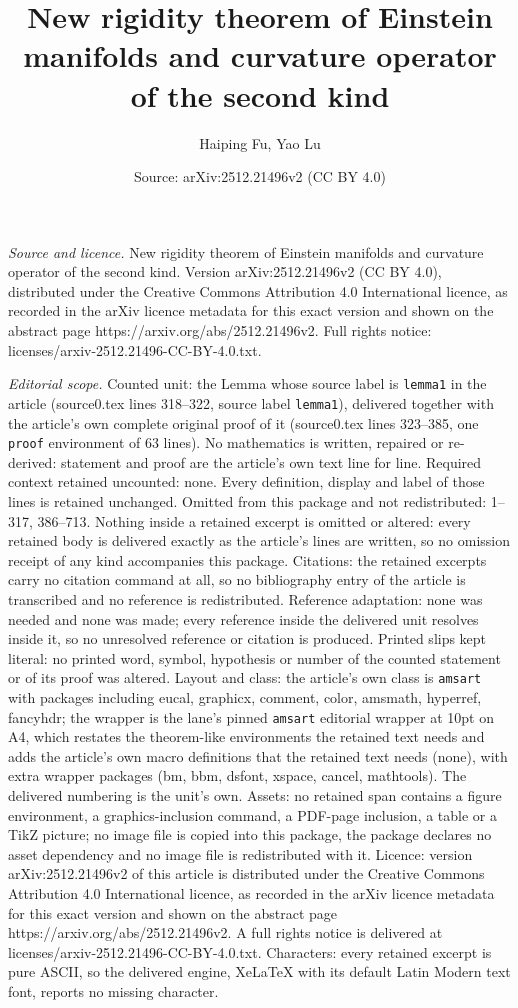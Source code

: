 \documentclass[10pt,a4paper]{amsart}
\title[New rigidity theorem of Einstein manifolds and curvature ope]{New rigidity theorem of Einstein manifolds and curvature operator of the second kind}
\author{Haiping Fu, Yao Lu}
\date{Source: arXiv:2512.21496v2 (CC BY 4.0)}
\begin{document}
\maketitle

\noindent\emph{Source and licence.} New rigidity theorem of Einstein manifolds and curvature operator of the second kind. Version arXiv:2512.21496v2 (CC BY 4.0), distributed under the Creative Commons Attribution 4.0 International licence, as recorded in the arXiv licence metadata for this exact version and shown on the abstract page https://arxiv.org/abs/2512.21496v2. Full rights notice: licenses/arxiv-2512.21496-CC-BY-4.0.txt.\par\smallskip

\noindent\textit{Editorial scope.} Counted unit: the Lemma whose source label is \texttt{lemma1} in the article (source0.tex lines 318--322, source label \texttt{lemma1}), delivered together with the article's own complete original proof of it (source0.tex lines 323--385, one \texttt{proof} environment of 63 lines). No mathematics is written, repaired or re-derived: statement and proof are the article's own text line for line. Required context retained uncounted: none. Every definition, display and label of those lines is retained unchanged. Omitted from this package and not redistributed: 1--317, 386--713. Nothing inside a retained excerpt is omitted or altered: every retained body is delivered exactly as the article's lines are written, so no omission receipt of any kind accompanies this package. Citations: the retained excerpts carry no citation command at all, so no bibliography entry of the article is transcribed and no reference is redistributed. Reference adaptation: none was needed and none was made; every reference inside the delivered unit resolves inside it, so no unresolved reference or citation is produced. Printed slips kept literal: no printed word, symbol, hypothesis or number of the counted statement or of its proof was altered. Layout and class: the article's own class is \texttt{amsart} with packages including eucal, graphicx, comment, color, amsmath, hyperref, fancyhdr; the wrapper is the lane's pinned \texttt{amsart} editorial wrapper at 10pt on A4, which restates the theorem-like environments the retained text needs and adds the article's own macro definitions that the retained text needs (none), with extra wrapper packages (bm, bbm, dsfont, xspace, cancel, mathtools). The delivered numbering is the unit's own. Assets: no retained span contains a figure environment, a graphics-inclusion command, a PDF-page inclusion, a table or a TikZ picture; no image file is copied into this package, the package declares no asset dependency and no image file is redistributed with it. Licence: version arXiv:2512.21496v2 of this article is distributed under the Creative Commons Attribution 4.0 International licence, as recorded in the arXiv licence metadata for this exact version and shown on the abstract page https://arxiv.org/abs/2512.21496v2. A full rights notice is delivered at licenses/arxiv-2512.21496-CC-BY-4.0.txt. Characters: every retained excerpt is pure ASCII, so the delivered engine, XeLaTeX with its default Latin Modern text font, reports no missing character.
\end{document}
